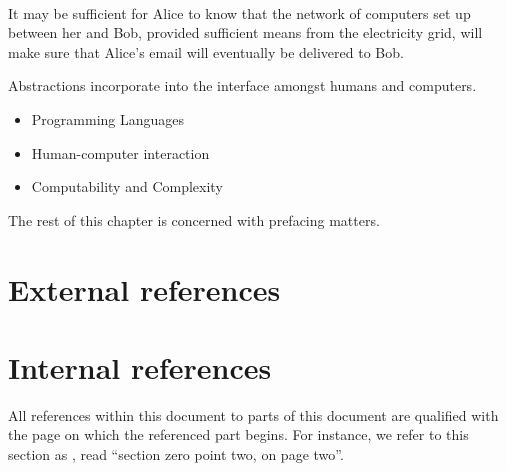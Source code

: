 \begin{example} \label{example:alice-bob-email} \

It may be sufficient for Alice to know that the network of computers set up
between her and Bob, provided sufficient means from the electricity grid, will
make sure that Alice's email will eventually be delivered to Bob. 

\end{example}

Abstractions incorporate into the interface amongst humans and computers.




\begin{itemize}

\item Programming Languages

\item Human-computer interaction

\item Computability and Complexity

\end{itemize}

The rest of this chapter is concerned with prefacing matters.

\section{External references}



\section{Internal references} \label{sec:introduction:internal-references}

All references within this document to parts of this document are qualified
with the page on which the referenced part begins. For instance, we refer to
this section as , read ``section
zero point two, on page two''.

